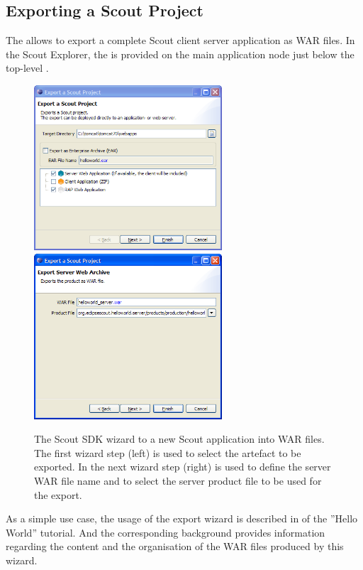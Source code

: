 \documentclass[a4paper,10pt,twoside]{book}
\begin{document}
\subsection{Exporting a Scout Project}

The  allows to export a complete Scout client server application as WAR files. 
In the Scout Explorer, the  is provided on the main application node just below the top-level . 

\begin{figure}
\includegraphics[width=7cm]{wizard_export_1.png} \hspace{5mm}
\includegraphics[width=7cm]{wizard_export_2.png}
\caption{The Scout SDK wizard to a new Scout application into WAR files.
The first wizard step (left) is used to select the artefact to be exported. 
In the next wizard step (right) is used to define the server WAR file name and to select the server product file to be used for the export.}
\end{figure}

As a simple use case, the usage of the export wizard is described in  of the ''Hello World'' tutorial. 
And the corresponding background  provides information regarding the content and the organisation of the WAR files produced by this wizard. 
\end{document}
